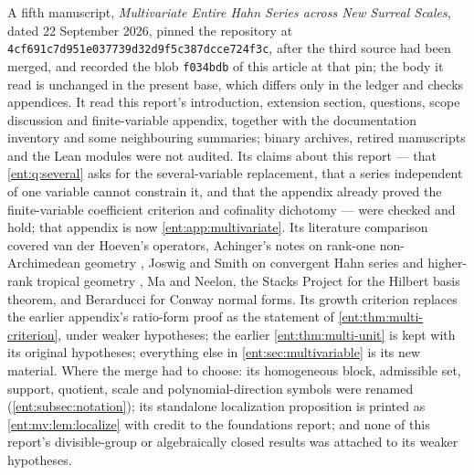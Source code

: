 \documentclass[11pt]{article}
\theoremstyle{plain}
\theoremstyle{plain}
\theoremstyle{plain}
\theoremstyle{definition}
\theoremstyle{definition}
\theoremstyle{definition}
\theoremstyle{definition}
\theoremstyle{remark}
\begin{document}
A fifth manuscript, \emph{Multivariate Entire Hahn Series across New Surreal
Scales}, dated 22 September 2026, pinned the repository at
\texttt{4cf691c7d951e037739d\allowbreak 32d9f5c387dcce724f3c}, after the third source
had been merged, and recorded the blob \texttt{f034bdb} of this article at
that pin; the body it read is unchanged in the present base, which differs
only in the ledger and checks appendices. It read this report's
introduction, extension section, questions, scope discussion and
finite-variable appendix, together with the documentation inventory and some
neighbouring summaries; binary archives, retired manuscripts and the Lean
modules were not audited. Its claims about this report --- that
\cref{ent:q:several} asks for the several-variable replacement, that a
series independent of one variable cannot constrain it, and that the appendix
already proved the finite-variable coefficient criterion and cofinality
dichotomy --- were checked and hold; that appendix is now
\cref{ent:app:multivariate}. Its literature comparison covered van der
Hoeven's operators, Achinger's notes on rank-one non-Archimedean geometry
\cite{Achinger}, Joswig and Smith on convergent Hahn series and higher-rank
tropical geometry \cite{JoswigSmith}, Ma and Neelon, the Stacks Project for
the Hilbert basis theorem, and Berarducci for Conway normal forms. Its growth
criterion replaces the earlier appendix's ratio-form proof as the statement
of \cref{ent:thm:multi-criterion}, under weaker hypotheses; the earlier
\cref{ent:thm:multi-unit} is kept with its original hypotheses; everything
else in \cref{ent:sec:multivariable} is its new material. Where the merge had
to choose: its homogeneous block, admissible set, support, quotient, scale
and polynomial-direction symbols were renamed (\cref{ent:subsec:notation});
its standalone localization proposition is printed as
\cref{ent:mv:lem:localize} with credit to the foundations report; and none
of this report's divisible-group or algebraically closed results was
attached to its weaker hypotheses.
\end{document}

